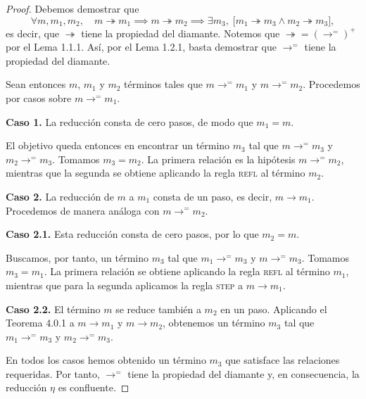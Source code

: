 \documentclass[
  spanish,
  letterpaper,
  DIV=11,
  numbers=noendperiod]{scrreprt}
\theoremstyle{remark}
\begin{document}
\begin{proof}
Debemos demostrar que \[
\forall m,m_1,m_2,\quad
m\twoheadrightarrow m_1\implies
m\twoheadrightarrow m_2\implies
\exists m_3,\;
\bigl[
m_1\twoheadrightarrow m_3\land
m_2\twoheadrightarrow m_3
\bigr],
\] es decir, que \(\twoheadrightarrow\) tiene la propiedad del diamante.
Notemos que \(\twoheadrightarrow=(\longrightarrow^{=})^+\) por el Lema
1.1.1. Así, por el Lema 1.2.1, basta demostrar que
\(\longrightarrow^{=}\) tiene la propiedad del diamante.

Sean entonces \(m\), \(m_1\) y \(m_2\) términos tales que
\(m\longrightarrow^{=}m_1\) y \(m\longrightarrow^{=}m_2\). Procedemos
por casos sobre \(m\longrightarrow^{=}m_1\).

\textbf{Caso 1.} La reducción consta de cero pasos, de modo que
\(m_1=m\).

El objetivo queda entonces en encontrar un término \(m_3\) tal que
\(m\longrightarrow^{=}m_3\) y \(m_2\longrightarrow^{=}m_3\). Tomamos
\(m_3=m_2\). La primera relación es la hipótesis
\(m\longrightarrow^{=}m_2\), mientras que la segunda se obtiene
aplicando la regla \textsc{refl} al término \(m_2\).

\textbf{Caso 2.} La reducción de \(m\) a \(m_1\) consta de un paso, es
decir, \(m\longrightarrow m_1\). Procedemos de manera análoga con
\(m\longrightarrow^{=}m_2\).

\textbf{Caso 2.1.} Esta reducción consta de cero pasos, por lo que
\(m_2=m\).

Buscamos, por tanto, un término \(m_3\) tal que
\(m_1\longrightarrow^{=}m_3\) y \(m\longrightarrow^{=}m_3\). Tomamos
\(m_3=m_1\). La primera relación se obtiene aplicando la regla
\textsc{refl} al término \(m_1\), mientras que para la segunda aplicamos
la regla \textsc{step} a \(m\longrightarrow m_1\).

\textbf{Caso 2.2.} El término \(m\) se reduce también a \(m_2\) en un
paso. Aplicando el Teorema 4.0.1 a \(m\longrightarrow m_1\) y
\(m\longrightarrow m_2\), obtenemos un término \(m_3\) tal que
\(m_1\longrightarrow^{=}m_3\) y \(m_2\longrightarrow^{=}m_3\).

En todos los casos hemos obtenido un término \(m_3\) que satisface las
relaciones requeridas. Por tanto, \(\longrightarrow^{=}\) tiene la
propiedad del diamante y, en consecuencia, la reducción \(\eta\) es
confluente.
\end{proof}
\end{document}
